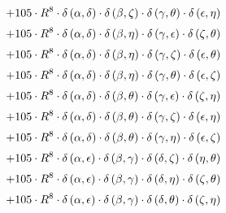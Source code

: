 \begin{subequations}
\begin{gather}
 \\[0.2em] \notag 		 + 105 \cdot R^{8} \cdot \delta{}\left(\alpha{}, \delta{}\right) \cdot \delta{}\left(\beta{}, \zeta{}\right) \cdot \delta{}\left(\gamma{}, \theta{}\right) \cdot \delta{}\left(\epsilon{}, \eta{}\right) 
 \\[0.2em] \notag 		 + 105 \cdot R^{8} \cdot \delta{}\left(\alpha{}, \delta{}\right) \cdot \delta{}\left(\beta{}, \eta{}\right) \cdot \delta{}\left(\gamma{}, \epsilon{}\right) \cdot \delta{}\left(\zeta{}, \theta{}\right) 
 \\[0.2em] \notag 		 + 105 \cdot R^{8} \cdot \delta{}\left(\alpha{}, \delta{}\right) \cdot \delta{}\left(\beta{}, \eta{}\right) \cdot \delta{}\left(\gamma{}, \zeta{}\right) \cdot \delta{}\left(\epsilon{}, \theta{}\right) 
 \\[0.2em] \notag 		 + 105 \cdot R^{8} \cdot \delta{}\left(\alpha{}, \delta{}\right) \cdot \delta{}\left(\beta{}, \eta{}\right) \cdot \delta{}\left(\gamma{}, \theta{}\right) \cdot \delta{}\left(\epsilon{}, \zeta{}\right) 
 \\[0.2em] \notag 		 + 105 \cdot R^{8} \cdot \delta{}\left(\alpha{}, \delta{}\right) \cdot \delta{}\left(\beta{}, \theta{}\right) \cdot \delta{}\left(\gamma{}, \epsilon{}\right) \cdot \delta{}\left(\zeta{}, \eta{}\right) 
 \\[0.2em] \notag 		 + 105 \cdot R^{8} \cdot \delta{}\left(\alpha{}, \delta{}\right) \cdot \delta{}\left(\beta{}, \theta{}\right) \cdot \delta{}\left(\gamma{}, \zeta{}\right) \cdot \delta{}\left(\epsilon{}, \eta{}\right) 
 \\[0.2em] \notag 		 + 105 \cdot R^{8} \cdot \delta{}\left(\alpha{}, \delta{}\right) \cdot \delta{}\left(\beta{}, \theta{}\right) \cdot \delta{}\left(\gamma{}, \eta{}\right) \cdot \delta{}\left(\epsilon{}, \zeta{}\right) 
 \\[0.2em] \notag 		 + 105 \cdot R^{8} \cdot \delta{}\left(\alpha{}, \epsilon{}\right) \cdot \delta{}\left(\beta{}, \gamma{}\right) \cdot \delta{}\left(\delta{}, \zeta{}\right) \cdot \delta{}\left(\eta{}, \theta{}\right) 
 \\[0.2em] \notag 		 + 105 \cdot R^{8} \cdot \delta{}\left(\alpha{}, \epsilon{}\right) \cdot \delta{}\left(\beta{}, \gamma{}\right) \cdot \delta{}\left(\delta{}, \eta{}\right) \cdot \delta{}\left(\zeta{}, \theta{}\right) 
 \\[0.2em] \notag 		 + 105 \cdot R^{8} \cdot \delta{}\left(\alpha{}, \epsilon{}\right) \cdot \delta{}\left(\beta{}, \gamma{}\right) \cdot \delta{}\left(\delta{}, \theta{}\right) \cdot \delta{}\left(\zeta{}, \eta{}\right) 

\end{gather}
\end{subequations}
